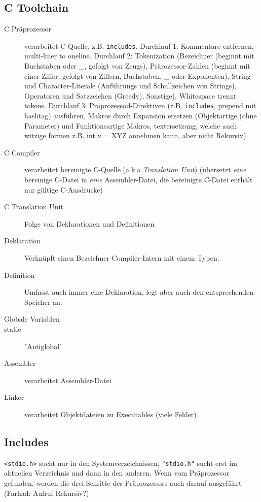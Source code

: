\begin{multicols*}{4}
    \section{C Toolchain}
    \begin{description}
        \item[C Präprozessor] verarbeitet C-Quelle, z.B. \texttt{includes}. Durchlauf 1: Kommentare entfernen, multi-liner to oneline. Durchlauf 2: Tokenization (Bezeichner (beginnt mit Buchstaben oder \_, gefolgt von Zeugs), Prärozessor-Zahlen (beginnt mit einer Ziffer, gefolgt von Ziffern, Buchstaben, \_ oder Exponenten), String- und Character-Literale (Anführungs und Schullzeichen von Strings), Operatoren und Satzzeichen (Greedy), Sonstige), Whitespace trennt tokens. Durchlauf 3: Präprozessod-Direktiven (z.B. \texttt{includes}, prepend mit hashtag) ausführen, Makros durch Expansion ersetzen (Objektartige (ohne Parameter) und Funktionsartige Makros, textersetzung, welche auch witzige formen z.B. int x = XYZ annehmen kann, aber nicht Rekursiv)
        \item[C Compiler] verarbeitet bereinigte C-Quelle (a.k.a \emph{Translation Unit}) (übersetzt \emph{eine} bereinige C-Datei in \emph{eine} Assembler-Datei, die bereinigte C-Datei enthält nur gültige C-Ausdrücke)
        \item[C Translation Unit] Folge von Deklarationen und Definitionen
        \item[Deklaration] Verknüpft einen Bezeichner Compiler-Intern mit einem Typen.
        \item[Definition] Umfasst auch immer eine Deklaration, legt aber auch den entsprechenden Speicher an.
        \item[Globale Variablen]
        \item[static] "Antiglobal"
        \item[Assembler] verarbeitet Assembler-Datei
        \item[Linker] verarbeitet Objektdateien zu Executables (viele Fehler)
    \end{description}

    \subsection{Includes}
    \texttt{<stdio.h>} sucht nur in den Systemverzeichnissen, \texttt{"stdio.h"} sucht erst im aktuellen Verzeichnis und dann in den anderen. Wenn vom Präprozessor gefunden, werden die drei Schritte des Präprozessors auch darauf ausgeführt (Farhad: Aufruf Rekursiv?)

\end{multicols*}

